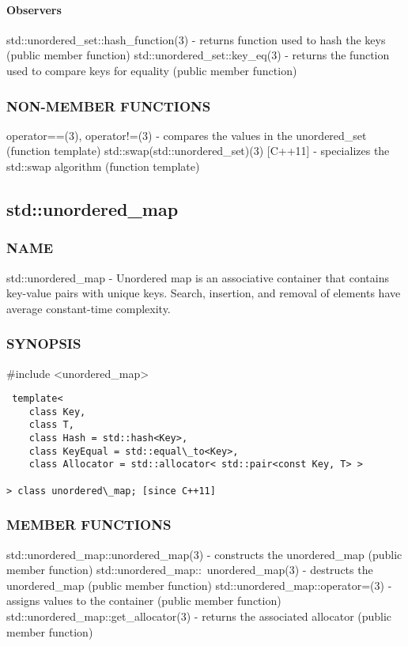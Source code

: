 \paragraph{Observers}
std::unordered\_set::hash\_function(3) - returns function used to hash the keys   (public member function)
std::unordered\_set::key\_eq(3) - returns the function used to compare keys for equality   (public member function)

\subsubsection{NON-MEMBER FUNCTIONS}
operator==(3), operator!=(3) - compares the values in the unordered\_set   (function template)
std::swap(std::unordered\_set)(3) [C++11] - specializes the std::swap algorithm   (function template)


\subsection{std::unordered\_map}

\subsubsection{NAME}
std::unordered\_map - Unordered map is an associative container that contains key-value pairs with unique keys. Search, insertion, and removal of elements have average constant-time complexity.

\subsubsection{SYNOPSIS}
\#include <unordered\_map>

\begin{lstlisting}
 template<
    class Key,
    class T,
    class Hash = std::hash<Key>,
    class KeyEqual = std::equal\_to<Key>,
    class Allocator = std::allocator< std::pair<const Key, T> >

> class unordered\_map; [since C++11]
\end{lstlisting}

\subsubsection{MEMBER FUNCTIONS}
std::unordered\_map::unordered\_map(3) - constructs the unordered\_map  (public member function)
std::unordered\_map::~unordered\_map(3) - destructs the unordered\_map  (public member function)
std::unordered\_map::operator=(3) - assigns values to the container   (public member function)
std::unordered\_map::get\_allocator(3) - returns the associated allocator   (public member function)
